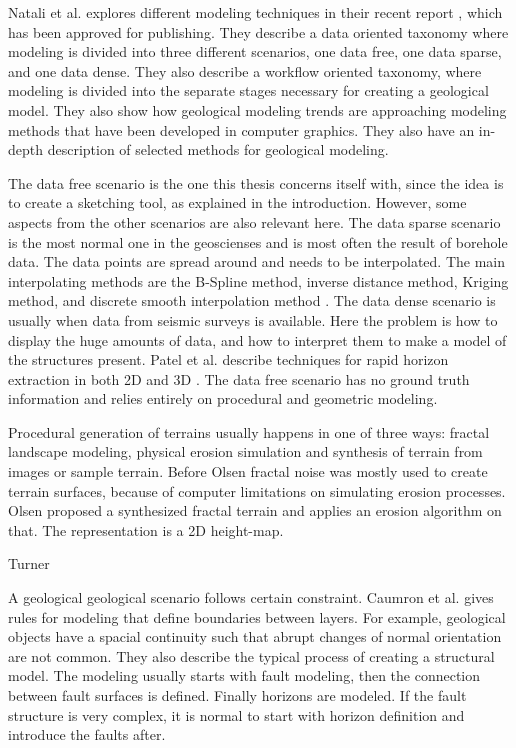\documentclass[a4paper,12pt]{report}
\begin{document}
Natali et al. explores different modeling techniques in their recent report \cite{natali2013modeling}, which has been approved for publishing. They describe a data oriented taxonomy where modeling is divided into three different scenarios, one data free, one data sparse, and one data dense. They also describe a workflow oriented taxonomy, where modeling is divided into the separate stages necessary for creating a geological model. They also show how geological modeling trends are approaching modeling methods that have been developed in computer graphics. They also have an in-depth description of selected methods for geological modeling.

The data free scenario is the one this thesis concerns itself with, since the idea is to create a sketching tool, as explained in the introduction. However, some aspects from the other scenarios are also relevant here. The data sparse scenario is the most normal one in the geoscienses and is most often the result of borehole data. 
 The data points are spread around and needs to be interpolated.
 The main interpolating methods are the B-Spline method, inverse distance method, Kriging method, and discrete smooth interpolation method \cite{Mal92, Mal97}.
 The data dense scenario is usually when data from seismic surveys is available. Here the problem is how to display the huge amounts of data, and how to interpret them to make a model of the structures present. Patel et al. describe techniques for rapid horizon extraction in both 2D \cite{PGT*08} and 3D \cite{PBVG10}. The data free scenario has no ground truth information and relies entirely on procedural and geometric modeling. 
 
 Procedural generation of terrains usually happens in one of three ways: fractal landscape modeling, physical erosion simulation and synthesis of terrain from images or sample terrain. Before Olsen \cite{Ols04} fractal noise was mostly used to create terrain surfaces, because of computer limitations on simulating erosion processes. Olsen proposed a synthesized fractal terrain and applies an erosion algorithm on that. The representation is a 2D height-map. 
 
 

Turner \cite{turner2007review}

A geological geological scenario follows certain constraint. Caumron et al. \cite{turner2006challenges} gives rules for modeling that define boundaries between layers. For example, geological objects have a spacial continuity such that abrupt changes of normal orientation are not common. They also describe  the typical process of creating a structural model. The modeling usually starts with fault modeling, then the connection between fault surfaces is defined. Finally horizons are modeled. If the fault structure is very complex, it is normal to start with horizon definition and introduce the faults after.
\end{document}
